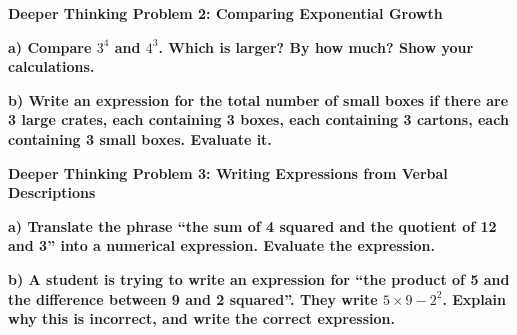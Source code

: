 \documentclass[12pt, letterpaper, fleqn]{article}
\begin{document}
\vspace{4mm}

\begin{tcolorbox}[colback=black!5, colframe=black!50, boxrule=1pt, arc=4mm, left=6mm, right=6mm, top=5mm, bottom=5mm]
\textbf{Deeper Thinking Problem 2: Comparing Exponential Growth}

\medskip

\noindent
\textbf{a) Compare $3^4$ and $4^3$. Which is larger? By how much? Show your calculations.}

\vspace{2.5cm}

\noindent
\textbf{b) Write an expression for the total number of small boxes if there are 3 large crates, each containing 3 boxes, each containing 3 cartons, each containing 3 small boxes. Evaluate it.}

\vspace{2cm}
\end{tcolorbox}
\newpage

\begin{tcolorbox}[colback=black!5, colframe=black!50, boxrule=1pt, arc=4mm, left=6mm, right=6mm, top=5mm, bottom=5mm]
\textbf{Deeper Thinking Problem 3: Writing Expressions from Verbal Descriptions}

\medskip

\noindent
\textbf{a) Translate the phrase ``the sum of 4 squared and the quotient of 12 and 3'' into a numerical expression. Evaluate the expression.}

\vspace{2.5cm}

\noindent
\textbf{b) A student is trying to write an expression for ``the product of 5 and the difference between 9 and 2 squared''. They write $5 \times 9 - 2^2$. Explain why this is incorrect, and write the correct expression.}

\vspace{2.5cm}
\end{tcolorbox}
\newpage
\end{document}
